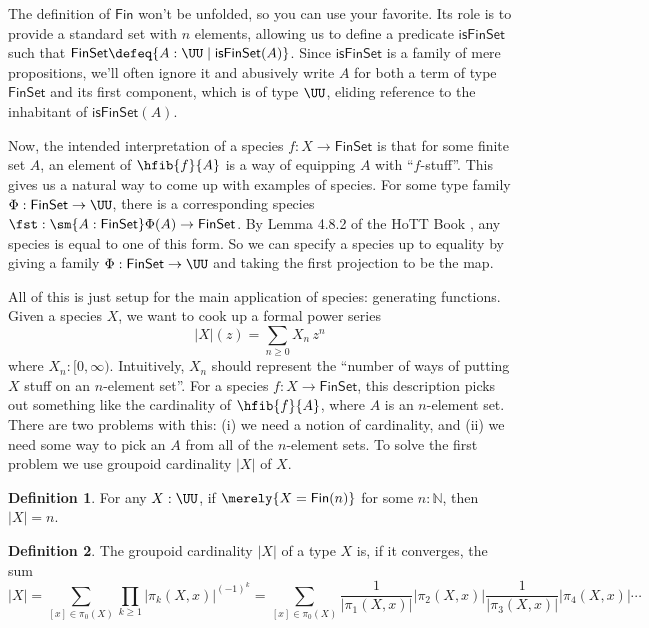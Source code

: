 \documentclass[fleqn]{article}
\newcommand{\gf}[1]{\abs{#1}\!(z)}
\newcommand{\fin}{\mathsf{Fin}}
\newcommand{\finset}{\mathsf{FinSet}}
\newcommand{\isfinset}{\mathsf{isFinSet}}
\newcommand{\abs}[1]{\left\lvert #1 \right\rvert}
\theoremstyle{theorem}
\theoremstyle{definition}
\newtheorem{defn}{Definition}[section]
\begin{document}
The definition of $\fin$ won't be unfolded, so you can use your favorite.  Its
role is to provide a standard set with $n$ elements, allowing us to define a
predicate $\isfinset$ such that $\finset \defeq \{A : \UU \mid \isfinset(A)\}$.
Since $\isfinset$ is a family of mere propositions, we'll often ignore it and
abusively write $A$ for both a term of type $\finset$ and its first component,
which is of type $\UU$, eliding reference to the inhabitant of $\isfinset(A)$.

Now, the intended interpretation of a species $f : X \to \finset$ is that for
some finite set $A$, an element of $\hfib{f}{A}$ is a way of equipping $A$ with
``$f$-stuff''.  This gives us a natural way to come up with examples of
species.  For some type family $\Phi : \finset \to \UU$, there is a
corresponding species $\fst : \sm{A : \finset}\Phi(A) \to \finset$.  By Lemma
4.8.2 of the \ac{HoTT} Book , any species is equal to one
of this form.  So we can specify a species up to equality by giving a family
$\Phi : \finset \to \UU$ and taking the first projection to be the map.

All of this is just setup for the main application of species: generating
functions.  Given a species $X$, we want to cook up a formal power series
\[
  \gf{X}
  =
  \sum_{n\geq0} X_{n}\, z^{n}
\]
where $X_{n} : [0, \infty)$.  Intuitively, $X_{n}$ should represent the
``number of ways of putting $X$ stuff on an $n$-element set''.  For a species
$f : X \to \finset$, this description picks out something like the cardinality
of $\hfib{f}{A}$, where $A$ is an $n$-element set.  There are two problems with
this: (i) we need a notion of cardinality, and (ii) we need some way to pick an
$A$ from all of the $n$-element sets.  To solve the first problem we use
groupoid cardinality $\abs{X}$ of $X$.

\begin{defn}
  For any $X : \UU$, if $\merely{X = \fin(n)}$ for some $n : \mathbb{N}$, then
  $\abs{X} = n$.
\end{defn}

\begin{defn}
  The groupoid cardinality $\abs{X}$ of a type $X$ is, if it converges, the sum
  \[
    \abs{X} 
    = \sum_{[x] \in \pi_{0}(X)}\prod_{k\geq1} 
        \abs{\pi_{k}(X, x)}^{(-1)^{k}}
    = \sum_{[x] \in \pi_{0}(X)}
        \frac{1}{\abs{\pi_{1}(X, x)}}\abs{\pi_{2}(X, x)}
        \frac{1}{\abs{\pi_{3}(X, x)}}\abs{\pi_{4}(X, x)}
        \dotsm
  \]
\end{defn}
\end{document}
